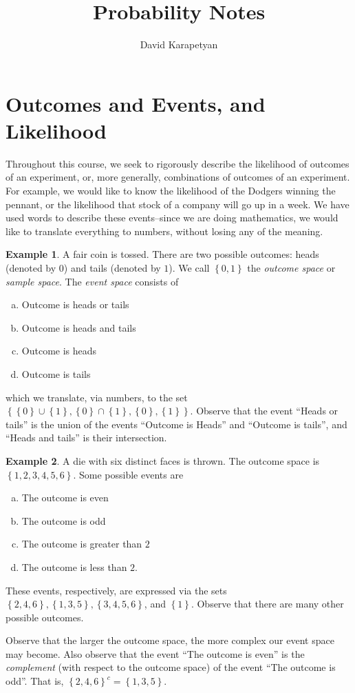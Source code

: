 \documentclass[12pt]{article}
\theoremstyle{plain}
\theoremstyle{definition}
\newtheorem*{example}{Example}
\theoremstyle{remark}
\numberwithin{equation}{section}  %
\begin{document}
\title{Probability Notes}
\author{David Karapetyan}
\date{}
\maketitle
\newpage
\setcounter{tocdepth}{2}
\setcounter{secnumdepth}{1}
\tableofcontents
\newpage
\section{Outcomes and Events, and Likelihood}
	Throughout this course, we seek to rigorously describe the likelihood of
	outcomes of an experiment, or, more generally, combinations of outcomes of an experiment.
	For example, we would like to know the likelihood of the Dodgers
	winning the pennant, or the likelihood that stock of a company will go up
	in a week. We have used words to describe these events--since we are doing
	mathematics, we would like to translate everything to numbers, without losing
	any of the meaning.
\begin{example}
A fair coin is tossed. There are two possible outcomes: heads (denoted by $0$) 
and tails (denoted by $1$). We call $ \left\{ 0,1 \right\} $ the \emph{outcome
space} or \emph{sample space}. The \emph{event space} consists of
\begin{enumerate}[a)]
\item Outcome is heads or tails
\item Outcome is heads and tails
\item Outcome is heads
\item Outcome is tails
\end{enumerate}
which we translate, via numbers, to the set $ \left\{ \left\{ 0 \right\} \cup
\left\{ 1 \right\}, \left\{ 0 \right\} \cap \left\{ 1 \right\} , \left\{ 0
\right\} , \left\{ 1 \right\} \right \}$.
Observe that the event ``Heads or tails'' is the union of the events
``Outcome is Heads'' and ``Outcome is tails'', and ``Heads and tails'' is
their intersection.
\end{example}	

\begin{example}
A die with six distinct faces is thrown. The outcome space is
$ \left\{ 1, 2, 3, 4, 5, 6 \right\} $. Some possible events are
\begin{enumerate}[a)]
\item The outcome is even
\item The outcome is odd
\item The outcome is greater than $2$
\item The outcome is less than $2$.
\end{enumerate}
These events, respectively, are expressed via the sets
$ \left\{ 2, 4, 6 \right\} , \left\{ 1,3,5 \right\} , \left\{ 3, 4, 5, 6
\right\}$, and $\left\{ 1 \right\}$.
Observe that there are many other possible outcomes.
\end{example}
Observe that the larger the outcome space, the more complex
our event space may become. Also observe that the event
``The outcome is even'' is the \emph{complement} (with respect to the
outcome space) of
the event ``The outcome is odd''. That is, $ \left\{ 2,4,6 \right\}^c
= \left\{ 1,3,5 \right\} $.
\end{document}
